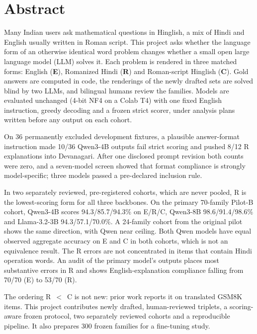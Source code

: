 \documentclass[12pt,a4paper,oneside]{report}
\renewcommand{\_}{\oldunderscore\allowbreak}
\newcommand{\form}[1]{\textbf{#1}}
\begin{document}
\chapter*{Abstract}
\thispagestyle{plain}

Many Indian users ask mathematical questions in Hinglish, a mix of Hindi and English usually written in Roman script. This project asks whether the language form of an otherwise identical word problem changes whether a small open large language model (LLM) solves it. Each problem is rendered in three matched forms: English (\form{E}), Romanized Hindi (\form{R}) and Roman-script Hinglish (\form{C}). Gold answers are computed in code, the renderings of the newly drafted sets are solved blind by two LLMs, and bilingual humans review the families. Models are evaluated unchanged (4-bit NF4 on a Colab T4) with one fixed English instruction, greedy decoding and a frozen strict scorer, under analysis plans written before any output on each cohort.

On 36 permanently excluded development fixtures, a plausible answer-format instruction made 10/36 Qwen3-4B outputs fail strict scoring and pushed 8/12 R explanations into Devanagari. After one disclosed prompt revision both counts were zero, and a seven-model screen showed that format compliance is strongly model-specific; three models passed a pre-declared inclusion rule.

In two separately reviewed, pre-registered cohorts, which are never pooled, R is the lowest-scoring form for all three backbones. On the primary 70-family Pilot-B cohort, Qwen3-4B scores 94.3/85.7/94.3\% on E/R/C, Qwen3-8B 98.6/91.4/98.6\% and Llama-3.2-3B 94.3/57.1/70.0\%. A 24-family cohort from the original pilot shows the same direction, with Qwen near ceiling. Both Qwen models have equal observed aggregate accuracy on E and C in both cohorts, which is not an equivalence result. The R errors are not concentrated in items that contain Hindi operation words. An audit of the primary model's outputs places most substantive errors in R and shows English-explanation compliance falling from 70/70 (E) to 53/70 (R).

The ordering R~$<$~C is not new: prior work reports it on translated GSM8K items. This project contributes newly drafted, human-reviewed triplets, a scoring-aware frozen protocol, two separately reviewed cohorts and a reproducible pipeline. It also prepares 300 frozen families for a fine-tuning study.
\end{document}
